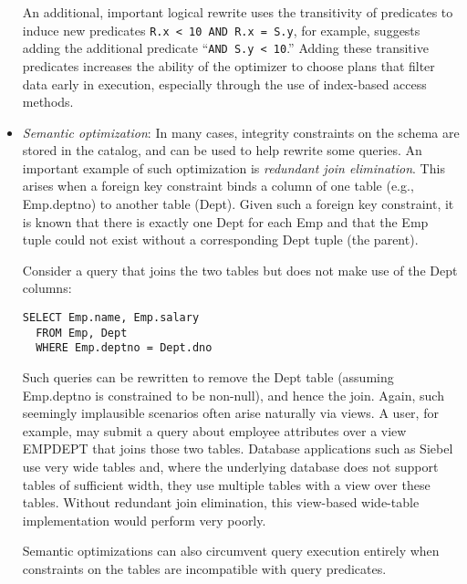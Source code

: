 \documentclass[a4paper,11pt,twoside,openright]{book}
\begin{document}
\begin{itemize}
An additional, important logical rewrite uses the transitivity of
		predicates to induce new predicates \texttt{R.x \textless{} 10 AND R.x = S.y},
		for example, suggests adding the additional predicate ``\texttt{AND S.y
		\textless{} 10}.'' Adding these transitive predicates increases the
ability of the optimizer to choose plans that filter data early in
execution, especially through the use of index-based access methods.
\item
  \emph{Semantic optimization}: In many cases, integrity constraints on
  the schema are stored in the catalog, and can be used to help rewrite
  some queries. An important example of such optimization is
  \emph{redundant join elimination}. This arises when a foreign key
  constraint binds a column of one table (e.g., Emp.deptno) to another
  table (Dept). Given such a foreign key constraint, it is known that
  there is exactly one Dept for each Emp and that the Emp tuple could
  not exist without a corresponding Dept tuple (the parent).

Consider a query that joins the two tables but does not make use of the
Dept columns:

		\begin{verbatim}
SELECT Emp.name, Emp.salary
  FROM Emp, Dept
  WHERE Emp.deptno = Dept.dno
		\end{verbatim}

Such queries can be rewritten to remove the Dept table (assuming
Emp.deptno is constrained to be non-null), and hence the join. Again,
such seemingly implausible scenarios often arise naturally via views. A
user, for example, may submit a query about employee attributes over a
view EMPDEPT that joins those two tables. Database applications such as
Siebel use very wide tables and, where the underlying database does not
support tables of sufficient width, they use multiple tables with a view
over these tables. Without redundant join elimination, this view-based
wide-table implementation would perform very poorly.

Semantic optimizations can also circumvent query execution entirely when
constraints on the tables are incompatible with query predicates.


\end{itemize}
\end{document}

